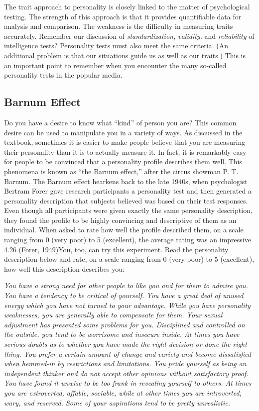 \documentclass[
]{book}
\begin{document}
The trait approach to personality is closely linked to the matter of psychological testing. The strength of this approach is that it provides quantifiable data for analysis and comparison. The weakness is the difficulty in measuring traits accurately. Remember our discussion of \emph{standardization, validity,} and \emph{reliability} of intelligence tests? Personality tests must also meet the same criteria. (An additional problem is that our situations guide us as well as our traits.) This is an important point to remember when you encounter the many so-called personality tests in the popular media.

\hypertarget{barnum-effect}{%
\subsection*{Barnum Effect}\label{barnum-effect}}

Do you have a desire to know what ``kind'' of person you are? This common desire can be used to manipulate you in a variety of ways. As discussed in the textbook, sometimes it is easier to make people believe that you are measuring their personality than it is to actually measure it. In fact, it is remarkably easy for people to be convinced that a personality profile describes them well. This phenomena is known as ``the Barnum effect,'' after the circus showman P. T. Barnum. The Barnum effect hearkens back to the late 1940s, when psychologist Bertram Forer gave research participants a personality test and then generated a personality description that subjects believed was based on their test responses. Even though all participants were given exactly the same personality description, they found the profile to be highly convincing and descriptive of them as an individual. When asked to rate how well the profile described them, on a scale ranging from 0 (very poor) to 5 (excellent), the average rating was an impressive 4.26 (Forer, 1949)You, too, can try this experiment. Read the personality description below and rate, on a scale ranging from 0 (very poor) to 5 (excellent), how well this description describes you:

\emph{You have a strong need for other people to like you and for them to ad­mire you. You have a tendency to be critical of yourself. You have a great deal of unused energy which you have not turned to your advantage. While you have personality weaknesses, you are generally able to compensate for them. Your sexual adjustment has presented some problems for you. Dis­ci­plined and controlled on the outside, you tend to be worrisome and in­se­cure inside. At times you have serious doubts as to whether you have made the right decision or done the right thing. You prefer a certain amount of change and variety and become dissatisfied when hemmed-in by restrictions and limitations. You pride yourself as being an independent thinker and do not accept other opinions without satisfactory proof. You have found it un­wise to be too frank in revealing yourself to others. At times you are extro­verted, affable, sociable, while at other times you are introverted, wary, and reserved. Some of your aspirations tend to be pretty unrealistic.}
\end{document}
